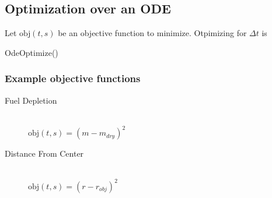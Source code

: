 \subsection{Optimization over an ODE}
Let $\mathrm{obj}\left(t,s\right)$ be an objective function to minimize. Otpimizing for $\Delta{}t$ is
\begin{function}
    \DontPrintSemicolon
    \caption{OdeOptimize()}
\end{function}

\pagebreak
\subsubsection{Example objective functions}
\begin{description}
\item[Fuel Depletion] \hfill \\
$\mathrm{obj}\left(t,s\right) = \left(m - m_{dry}\right)^2$
\item[Distance From Center] \hfill \\
$\mathrm{obj}\left(t,s\right) = \left(r - r_{obj}\right)^2$
\end{description}


